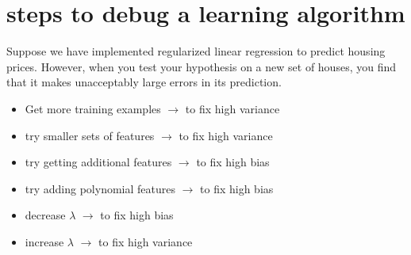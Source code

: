 \documentclass[a4paper,12pt]{report}
\begin{document}
\section{steps to debug a learning algorithm}
Suppose we have implemented regularized linear regression to predict housing prices. However, when you test your hypothesis on a new set of houses, you find that it makes unacceptably large errors in its prediction.
\begin{itemize}
\item Get more training examples $\rightarrow$ to fix high variance
\item try smaller sets of features $\rightarrow$ to fix high variance
\item try getting additional features $\rightarrow$ to fix high bias
\item try adding polynomial features $\rightarrow$ to fix high bias
\item decrease $\lambda$ $\rightarrow$ to fix high bias
\item increase $\lambda$ $\rightarrow$ to fix high variance
\end{itemize}
\end{document}
